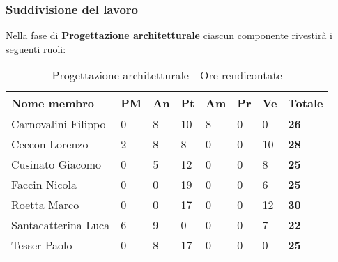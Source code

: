 		\subsubsection{Suddivisione del lavoro} %
		\label{ssub:suddivisione_del_lavoro}
		Nella fase di \textbf{Progettazione architetturale} ciascun componente rivestirà i seguenti ruoli: \\
			\begin{table}[!ht]
				\begin{center}
					\begin{tabularx}{0.9\textwidth}{|l|l|l|l|l|l|l|X|}
						\hline
						\textbf{Nome membro} & \textbf{PM} & \textbf{An} & \textbf{Pt} & \textbf{Am} & \textbf{Pr} & \textbf{Ve} & \textbf{Totale} \\
						\hline
						Carnovalini Filippo & 0 & 8 & 10 & 8 & 0 & 0 & \textbf{26} \\
						\hline
						Ceccon Lorenzo & 2 & 8 & 8 & 0 & 0 & 10 & \textbf{28} \\
						\hline
						Cusinato Giacomo & 0 & 5 & 12 & 0 & 0 & 8 & \textbf{25} \\
						\hline
						Faccin Nicola & 0 & 0 & 19 & 0 & 0 & 6 & \textbf{25} \\
						\hline
						Roetta Marco & 0 & 0 & 17 & 0 & 0 & 12 & \textbf{30} \\
						\hline
						Santacatterina Luca & 6 & 9 & 0 & 0 & 0 & 7 & \textbf{22} \\
						\hline
						Tesser Paolo & 0 & 8 & 17 & 0 & 0 & 0 & \textbf{25} \\
						\hline	
					\end{tabularx}
				\end{center}
			\caption{Progettazione architetturale - Ore rendicontate}
			\end{table}
			
